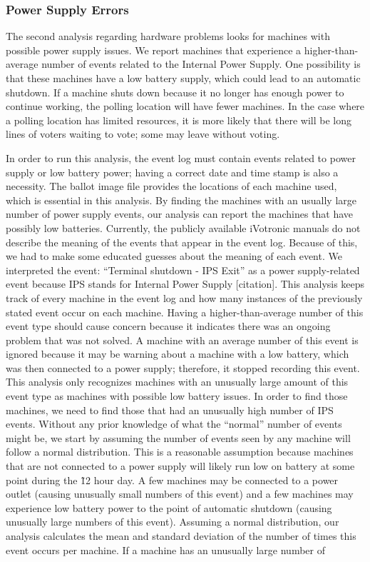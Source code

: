 \subsubsection{Power Supply Errors}
The second analysis regarding hardware problems looks for machines with possible power supply issues.  We report machines that experience a higher-than-average number of events related to the Internal Power Supply. One possibility is that these machines have a low battery supply, which could lead to an automatic shutdown.  If a machine shuts down because it no longer has enough power to continue working, the polling location will have fewer machines.  In the case where a polling location has limited resources, it is more likely that there will be long lines of voters waiting to vote; some may leave without voting.  

In order to run this analysis, the event log must contain events related to power supply or low battery power; having a correct date and time stamp is also a necessity.  The ballot image file provides the locations of each machine used, which is essential in this analysis.  By finding the machines with an usually large number of power supply events, our analysis can report the machines that have possibly low batteries.  Currently, the publicly available iVotronic manuals do not describe the meaning of the events that appear in the event log.  Because of this, we had to make some educated guesses about the meaning of each event.  We interpreted the event: \textquotedblleft Terminal shutdown - IPS Exit\textquotedblright \hspace{1 mm} as a power supply-related event because IPS stands for Internal Power Supply [citation].  This analysis keeps track of every machine in the event log and how many instances of the previously stated event occur on each machine.  Having a higher-than-average number of this event type should cause concern because it indicates there was an ongoing problem that was not solved. A machine with an average number of this event is ignored because it may be warning about a machine with a low battery, which was then connected to a power supply; therefore, it stopped recording this event. This analysis only recognizes machines with an unusually large amount of this event type as machines with possible low battery issues. In order to find those machines, we need to find those that had an unusually high number of IPS events. Without any prior knowledge of what the \textquotedblleft normal\textquotedblright \hspace{1 mm} number of events might be, we start by assuming the number of events seen by any machine will follow a normal distribution. This is a reasonable assumption because machines that are not connected to a power supply will likely run low on battery at some point during the \~12 hour day. A few machines may be connected to a power outlet (causing unusually small numbers of this event) and a few machines may experience low battery power to the point of automatic shutdown (causing unusually large numbers of this event).  Assuming a normal distribution, our analysis calculates the mean and standard deviation of the number of times this event occurs per machine.  If a machine has an unusually large number of 